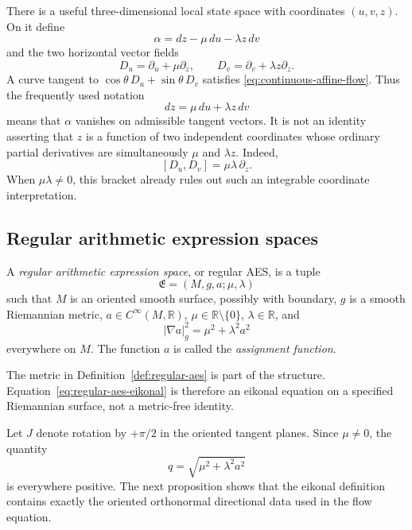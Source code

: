 There is a useful three-dimensional local state space with coordinates
\((u,v,z)\).  On it define
\begin{equation}\label{eq:affine-pfaffian-form}
 \alpha=dz-\mu\,du-\lambda z\,dv
\end{equation}
and the two horizontal vector fields
\begin{equation}\label{eq:affine-horizontal-fields}
 D_u=\partial_u+\mu\partial_z,
 \qquad
 D_v=\partial_v+\lambda z\partial_z.
\end{equation}
A curve tangent to
\(\cos\theta\,D_u+\sin\theta\,D_v\) satisfies
\eqref{eq:continuous-affine-flow}.  Thus the frequently used notation
\[
 dz=\mu\,du+\lambda z\,dv
\]
means that \(\alpha\) vanishes on admissible tangent vectors.  It is not an
identity asserting that \(z\) is a function of two independent coordinates whose
ordinary partial derivatives are simultaneously \(\mu\) and \(\lambda z\).
Indeed,
\begin{equation}\label{eq:horizontal-noncommutation}
 [D_u,D_v]=\mu\lambda\,\partial_z.
\end{equation}
When \(\mu\lambda\ne0\), this bracket already rules out such an integrable
coordinate interpretation.

\subsection{Regular arithmetic expression spaces}

\begin{definition}\label{def:regular-aes}
A \emph{regular arithmetic expression space}, or regular AES, is a tuple
\[
 \mathfrak E=(M,g,a;\mu,\lambda)
\]
such that \(M\) is an oriented smooth surface, possibly with boundary, \(g\) is a smooth Riemannian
metric, \(a\in C^\infty(M,\mathbb R)\), \(\mu\in\mathbb R\setminus\{0\}\),
\(\lambda\in\mathbb R\), and
\begin{equation}\label{eq:regular-aes-eikonal}
 |\nabla a|_g^2=\mu^2+\lambda^2a^2
\end{equation}
everywhere on \(M\).  The function \(a\) is called the
\emph{assignment function}.
\end{definition}

The metric in Definition~\ref{def:regular-aes} is part of the structure.
Equation~\eqref{eq:regular-aes-eikonal} is therefore an eikonal equation on a
specified Riemannian surface, not a metric-free identity.

Let \(J\) denote rotation by \(+\pi/2\) in the oriented tangent planes.  Since
\(\mu\ne0\), the quantity
\[
 q=\sqrt{\mu^2+\lambda^2a^2}
\]
is everywhere positive.  The next proposition shows that the eikonal definition
contains exactly the oriented orthonormal directional data used in the flow
equation.

